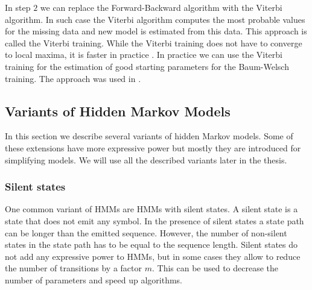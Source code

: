 In step $2$ we can replace the Forward-Backward algorithm with the Viterbi
algorithm. In such case the Viterbi algorithm computes the most probable values
for the missing data and new model is estimated from this data.
This approach is called the Viterbi training.  While the Viterbi training does
not have to converge to local maxima, it is faster in practice
\cite{Durbin1998}.  In practice we can use the Viterbi training for the
estimation of good starting parameters for the Baum-Welsch training. The
approach was used in \cite{FEAST2011}.

\subsection{Variants of Hidden Markov Models}

In this section we describe several variants of hidden Markov models.  Some of
these extensions have more expressive power but mostly they are introduced for
simplifying  models. We will use all the described variants later in the
thesis.

\subsubsection{Silent states}

One common variant of HMMs are HMMs with silent states. A silent state is a state
that does not emit any symbol. In the presence of silent states a state path can
be longer than the emitted sequence. However, the number of non-silent states in
the state path has to be equal to the sequence length. Silent states do not
add any expressive power to HMMs, but in some cases they allow to reduce the
number of transitions by a factor $m$. This can be used to decrease the number of
parameters and speed up algorithms. 

